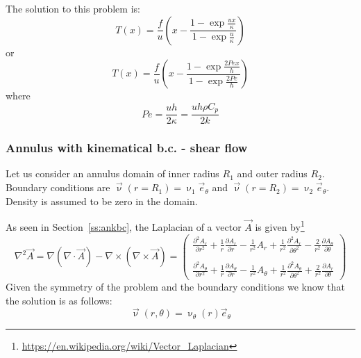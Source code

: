 The solution to this problem is:
\[
T(x) = \frac{f}{u}\left( x - \frac{1-\exp \frac{ux}{\kappa}}{1-\exp \frac{u}{\kappa} } \right)
\]
or 
\[
T(x) = \frac{f}{u}\left( x - \frac{1-\exp \frac{2 Pe x}{h}}{1-\exp \frac{2 Pe}{h} } \right)
\]
where
\[
Pe = \frac{uh}{2 \kappa} = \frac{u h \rho C_p}{2 k}
\]


\subsubsection{Annulus with kinematical b.c. - shear flow}\label{ss:sfan}

Let us consider an annulus domain of inner radius $R_1$ and outer radius $R_2$.
Boundary conditions are $\vec\upnu(r=R_1)=\upnu_1 \vec{e}_\theta$ and 
$\vec\upnu(r=R_2)=\upnu_2 \vec{e}_\theta$. Density is assumed to be zero in the domain. 

As seen in Section~\ref{ss:ankbc}, the Laplacian of a vector $\vec{A}$ is given 
by\footnote{\url{https://en.wikipedia.org/wiki/Vector\_Laplacian}} 
\[
\nabla^2 \vec{A} = \nabla(\nabla\cdot\vec{A}) - \nabla\times(\nabla \times\vec{A})
=
\left(
\begin{array}{l}
\frac{\partial^2 A_r}{\partial r^2} + \frac{1}{r} \frac{\partial A_r}{\partial r} - \frac{1}{r^2} A_r  + \frac{1}{r^2} \frac{\partial^2 A_r}{\partial \theta^2}  - \frac{2}{r^2} \frac{\partial A_\theta}{\partial \theta} \\ \\
\frac{\partial^2 A_\theta}{\partial r^2} + \frac{1}{r} \frac{\partial A_\theta}{\partial r} - \frac{1}{r^2} A_\theta  + \frac{1}{r^2} \frac{\partial^2 A_\theta}{\partial \theta^2}  + \frac{2}{r^2} \frac{\partial A_r}{\partial \theta} 
\end{array}
\right)
\]
Given the symmetry of the problem and the boundary conditions we know that the 
solution is as follows: 
\[
{\vec \upnu}(r,\theta) = \upnu_\theta(r) {\vec e}_\theta
\]

